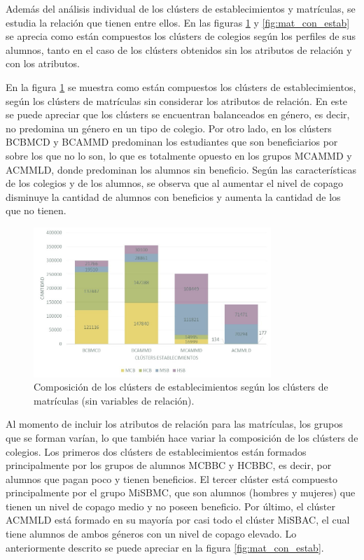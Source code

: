 Además del análisis individual de los clústers de establecimientos y matrículas, se estudia la relación que tienen entre ellos. En las figuras \ref{fig:mat_sin_estab} y \ref{fig:mat_con_estab} se aprecia como están compuestos los clústers de colegios según los perfiles de sus alumnos, tanto en el caso de los clústers obtenidos sin los atributos de relación y con los atributos.

En la figura \ref{fig:mat_sin_estab} se muestra como están compuestos los clústers de establecimientos, según los clústers de matrículas sin considerar los atributos de relación. En este se puede apreciar que los clústers se encuentran balanceados en género, es decir, no predomina un género en un tipo de colegio. Por otro lado, en los clústers BCBMCD y BCAMMD predominan los estudiantes que son beneficiarios por sobre los que no lo son, lo que es totalmente opuesto en los grupos MCAMMD y ACMMLD, donde predominan los alumnos sin beneficio. Según las características de los colegios y de los alumnos, se observa que al aumentar el nivel de copago disminuye la cantidad de alumnos con beneficios y aumenta la cantidad de los que no tienen.

\begin{figure}[H]
    \centering
    \includegraphics[width=0.8\textwidth]{images/matriculas/Mat_sin_estab.jpg}
    \caption{Composición de los clústers de establecimientos según los clústers de matrículas (sin variables de relación).}
    \label{fig:mat_sin_estab}
\end{figure}

Al momento de incluir los atributos de relación para las matrículas, los grupos que se forman varían, lo que también hace variar la composición de los clústers de colegios. Los primeros dos clústers de establecimientos están formados principalmente por los grupos de alumnos MCBBC y HCBBC, es decir, por alumnos que pagan poco y tienen beneficios. El tercer clúster está compuesto principalmente por el grupo MiSBMC, que son alumnos (hombres y mujeres) que tienen un nivel de copago medio y no poseen beneficio. Por último, el clúster ACMMLD está formado en su mayoría por casi todo el clúster MiSBAC, el cual tiene alumnos de ambos géneros con un nivel de copago elevado. Lo anteriormente descrito se puede apreciar en la figura \ref{fig:mat_con_estab}.

